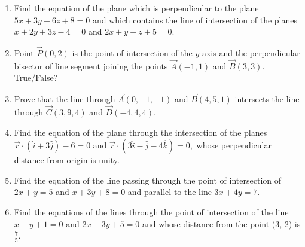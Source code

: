 \begin{enumerate}[label=\thesubsection.\arabic*, ref=\thesubsection.\theenumi]
\item Find the equation of the plane which is perpendicular to the plane $5x+3y+6z+8=0$ and which contains the line of intersection of the planes $x+2y+3z-4=0$ and $2x+y-z+5=0.$
\item  Point $\vec{P}(0, 2)$ is the point of intersection of the $y$-axis and the perpendicular bisector of line segment joining the points $\vec{A}(-1, 1) $ and $ \vec{B}(3, 3)$. True/False?
\item Prove that the line through $\vec{A}(0, -1, -1)$ and $\vec{B}(4, 5, 1)$ intersects the line through $\vec{C}(3, 9, 4)$ and $\vec{D}(-4, 4, 4)$.
\item Find the equation of the plane through the intersection of the planes $\overrightarrow{r} \cdot (\hat{i}+3\hat{j}) - 6=0$ and $\overrightarrow{r} \cdot (3\hat{i}-\hat{j}-4\hat{k})=0, $ whose perpendicular distance from origin is unity.
\item Find the equation of the line passing through the point of intersection of $2x+y=5$ and $x+3y+8=0$ and parallel to the line $3x+4y=7$.
\item Find the equations of the lines through the point of intersection of the line $x-y+1=0 $ and $2x-3y+5=0$ and whose distance from the point (3, 2) is $\frac{7}{5}$.
\end{enumerate}
